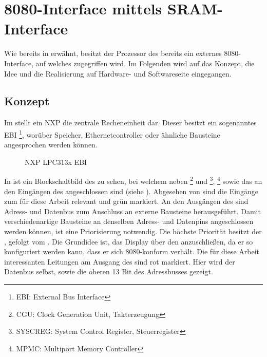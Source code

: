 \section{8080-Interface mittels SRAM-Interface}
\label{sec:TeilA_8080SRAM}
Wie bereits in  erwähnt, besitzt der Prozessor des  bereits ein externes 8080-Interface, auf welches zugegriffen wird. Im Folgenden wird auf das Konzept, die Idee und die Realisierung auf Hardware- und Softwareseite eingegangen.
\newpage
\subsection{Konzept}
\label{cha:teila_konzept}
Im  stellt ein NXP  die zentrale Recheneinheit dar. Dieser besitzt ein sogenanntes EBI \footnote{EBI: External Bus Interface}, worüber Speicher, Ethernetcontroller oder ähnliche Bausteine angesprochen werden können.

\begin{figure}[htp]
	\centering
{}
	\caption{NXP LPC313x EBI}
	\label{fig:lpc_ebi}
\end{figure}

In  ist ein Blockschaltbild des  zu sehen, bei welchem neben \footnote{CGU: Clock Generation Unit, Takterzeugung} und \footnote{SYSCREG: System Control Register, Steuerregister}, \footnote{MPMC: Multiport Memory Controller} sowie das  an den Eingängen des  angeschlossen sind (siehe \cite{NXP2010}). Abgesehen von  sind die Eingänge zum  für diese Arbeit relevant und grün markiert. An den Ausgängen des  sind Adress- und Datenbus zum Anschluss an externe Bausteine herausgeführt. Damit verschiedenartige Bausteine an denselben Adress- und Datenpins angeschlossen werden können, ist eine Priorisierung notwendig. Die höchste Priorität besitzt der , gefolgt vom . 
Die Grundidee ist, das Display über den  anzuschließen, da er so konfiguriert werden kann, dass er sich 8080-konform verhält. Die für diese Arbeit interessanten Leitungen am Ausgang des  sind rot markiert. Hier wird der Datenbus selbst, sowie die oberen 13 Bit des Adressbusses gezeigt.


